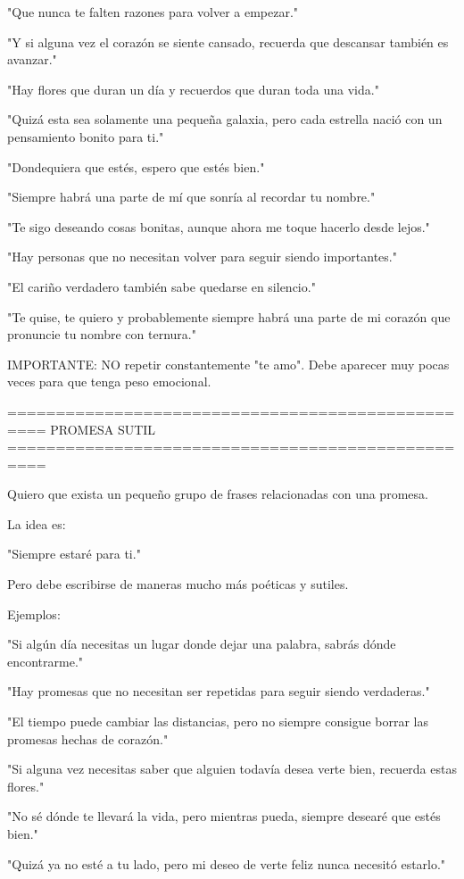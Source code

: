 "Que nunca te falten razones para volver a empezar."

"Y si alguna vez el corazón se siente cansado, recuerda que descansar también es avanzar."

"Hay flores que duran un día y recuerdos que duran toda una vida."

"Quizá esta sea solamente una pequeña galaxia, pero cada estrella nació con un pensamiento bonito para ti."

"Dondequiera que estés, espero que estés bien."

"Siempre habrá una parte de mí que sonría al recordar tu nombre."

"Te sigo deseando cosas bonitas, aunque ahora me toque hacerlo desde lejos."

"Hay personas que no necesitan volver para seguir siendo importantes."

"El cariño verdadero también sabe quedarse en silencio."

"Te quise, te quiero y probablemente siempre habrá una parte de mi corazón que pronuncie tu nombre con ternura."

IMPORTANTE:
NO repetir constantemente "te amo".
Debe aparecer muy pocas veces para que tenga peso emocional.

==================================================
PROMESA SUTIL
==================================================

Quiero que exista un pequeño grupo de frases relacionadas con una promesa.

La idea es:

"Siempre estaré para ti."

Pero debe escribirse de maneras mucho más poéticas y sutiles.

Ejemplos:

"Si algún día necesitas un lugar donde dejar una palabra, sabrás dónde encontrarme."

"Hay promesas que no necesitan ser repetidas para seguir siendo verdaderas."

"El tiempo puede cambiar las distancias, pero no siempre consigue borrar las promesas hechas de corazón."

"Si alguna vez necesitas saber que alguien todavía desea verte bien, recuerda estas flores."

"No sé dónde te llevará la vida, pero mientras pueda, siempre desearé que estés bien."

"Quizá ya no esté a tu lado, pero mi deseo de verte feliz nunca necesitó estarlo."

